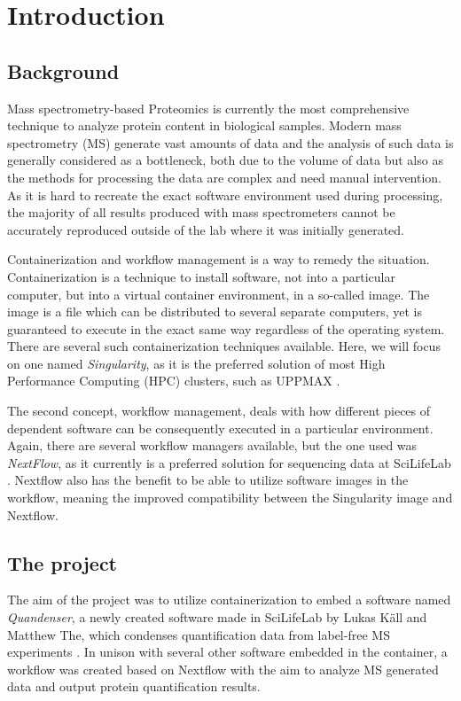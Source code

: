 \section{Introduction}

\subsection{Background}
Mass spectrometry-based Proteomics is currently the most comprehensive technique to analyze protein content in biological samples. Modern mass spectrometry (MS) generate vast amounts of data and the analysis of such data is generally considered as a bottleneck, both due to the volume of data but also as the methods for processing the data are complex and need manual intervention. As it is hard to recreate the exact software environment used during processing, the majority of all results produced with mass spectrometers cannot be accurately reproduced outside of the lab where it was initially generated.

Containerization and workflow management is a way to remedy the situation. Containerization is a technique to install software, not into a particular computer, but into a virtual container environment, in a so-called image. The image is a file which can be distributed to several separate computers, yet is guaranteed to execute in the exact same way regardless of the operating system. There are several such containerization techniques available. Here, we will focus on one named \textit{Singularity}, as it is the preferred solution of most High Performance Computing (HPC) clusters, such as UPPMAX \cite{singularity} \cite{singularity-uppmax}.

The second concept, workflow management, deals with how different pieces of dependent software can be consequently executed in a particular environment. Again, there are several workflow managers available, but the one used was \textit{NextFlow}, as it currently is a preferred solution for sequencing data at SciLifeLab \cite{nextflow}. Nextflow also has the benefit to be able to utilize software images in the workflow, meaning the improved compatibility between the Singularity image and Nextflow.

\subsection{The project}
The aim of the project was to utilize containerization to embed a software named \textit{Quandenser}, a newly created software made in SciLifeLab by Lukas Käll and Matthew The, which condenses quantification data from label-free MS experiments \cite{quandenser}. In unison with several other software embedded in the container, a workflow was created based on Nextflow with the aim to analyze MS generated data and output protein quantification results.

